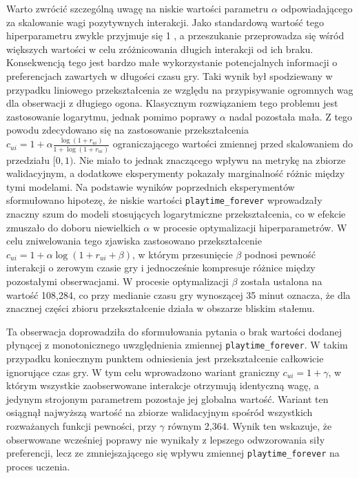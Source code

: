 Warto zwrócić szczególną uwagę na niskie wartości parametru $\alpha$ odpowiadającego za skalowanie wagi pozytywnych interakcji. Jako standardową wartość tego hiperparametru zwykle przyjmuje się 1 \cite{sparkals,frederickson2022implicit}, a przeszukanie przeprowadza się wśród większych wartości w celu zróżnicowania długich interakcji od ich braku. Konsekwencją tego jest bardzo małe wykorzystanie potencjalnych informacji o preferencjach zawartych w długości czasu gry. Taki wynik był spodziewany w przypadku liniowego przekształcenia ze względu na przypisywanie ogromnych wag dla obserwacji z długiego ogona. Klasycznym rozwiązaniem tego problemu jest zastosowanie logarytmu, jednak pomimo poprawy \ndcg{} $\alpha$ nadal pozostała mała. Z tego powodu zdecydowano się na zastosowanie przekształcenia $c_{ui} = 1 + \alpha \frac{\log(1 + r_{ui})}{1 + \log(1 + r_{ui})}$ ograniczającego wartości zmiennej przed skalowaniem do przedziału $[0, 1)$. Nie miało to jednak znaczącego wpływu na metrykę \ndcg{} na zbiorze walidacyjnym, a dodatkowe eksperymenty pokazały marginalność różnic między tymi modelami. Na podstawie wyników poprzednich eksperymentów sformułowano hipotezę, że niskie wartości \texttt{playtime\_forever} wprowadzały znaczny szum do modeli stosujących logarytmiczne przekształcenia, co w efekcie zmuszało do doboru niewielkich $\alpha$ w procesie optymalizacji hiperparametrów. W celu zniwelowania tego zjawiska zastosowano przekształcenie $c_{ui} = 1 + \alpha \log(1 + r_{ui} + \beta)$, w którym przesunięcie $\beta$ podnosi pewność interakcji o zerowym czasie gry i jednocześnie kompresuje różnice między pozostałymi obserwacjami. W procesie optymalizacji $\beta$ została ustalona na wartość 108,284, co przy medianie czasu gry wynoszącej 35 minut oznacza, że dla znacznej części zbioru przekształcenie działa w obszarze bliskim stałemu.

Ta obserwacja doprowadziła do sformułowania pytania o brak wartości dodanej płynącej z monotonicznego uwzględnienia zmiennej \texttt{playtime\_forever}. W takim przypadku koniecznym punktem odniesienia jest przekształcenie całkowicie ignorujące czas gry. W tym celu wprowadzono wariant graniczny $c_{ui} = 1 + \gamma$, w którym wszystkie zaobserwowane interakcje otrzymują identyczną wagę, a jedynym strojonym parametrem pozostaje jej globalna wartość. Wariant ten osiągnął najwyższą wartość \ndcg{} na zbiorze walidacyjnym spośród wszystkich rozważanych funkcji pewności, przy $\gamma$ równym 2,364. Wynik ten wskazuje, że obserwowane wcześniej poprawy nie wynikały z lepszego odwzorowania siły preferencji, lecz ze zmniejszającego się wpływu zmiennej \texttt{playtime\_forever} na proces uczenia.

